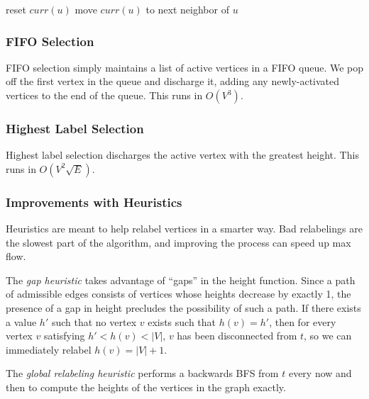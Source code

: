 \noindent \begin{minipage}{\textwidth}
\begin{algorithmic}
			\State {}
			\State reset $curr(u)$
		\Else
				\State {}
			\Else
				\State move $curr(u)$ to next neighbor of $u$
			\EndIf
		\EndIf
	\EndWhile
\EndFunction
\end{algorithmic}
\end{minipage}

\subsubsection{FIFO Selection}

FIFO selection simply maintains a list of active vertices in a FIFO queue. We pop off the first vertex in the queue and discharge it, adding any newly-activated vertices to the end of the queue. This runs in $O(V^3)$.

\subsubsection{Highest Label Selection}

Highest label selection discharges the active vertex with the greatest height. This runs in $O(V^2\sqrt{E})$.

\subsubsection{Improvements with Heuristics}

Heuristics are meant to help relabel vertices in a smarter way. Bad relabelings are the slowest part of the algorithm, and improving the process can speed up max flow.

The \textit{gap heuristic} takes advantage of ``gaps'' in the height function. Since a path of admissible edges consists of vertices whose heights decrease by exactly 1, the presence of a gap in height precludes the possibility of such a path. If there exists a value $h'$ such that no vertex $v$ exists such that $h(v)=h'$, then for every vertex $v$ satisfying $h' < h(v) < |V|$, $v$ has been disconnected from $t$, so we can immediately relabel $h(v)=|V| + 1$.

The \textit{global relabeling heuristic} performs a backwards BFS from $t$ every now and then to compute the heights of the vertices in the graph exactly.

